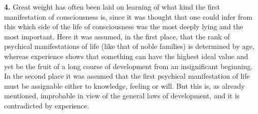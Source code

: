 \documentclass[12pt,a4paper]{book}
\begin{document}
\textbf{4.} Great weight has often been laid on learning of what kind the
first manifestation of consciousness is, since it was thought that one
could infer from this which side of the life of consciousness was the
most deeply lying and the most important. Here it was assumed, in the
first place, that the rank of psychical manifestations of life (like that
of noble families) is determined by age, whereas experience shows that
something can have the highest ideal value and yet be the fruit of a long
course of development from an insignificant beginning. In the second
place it was assumed that the first psychical manifestation of life must
be assignable either to knowledge, feeling or will. But this is, as
already mentioned, improbable in view of the general laws of development,
and it is contradicted by experience.
\end{document}
